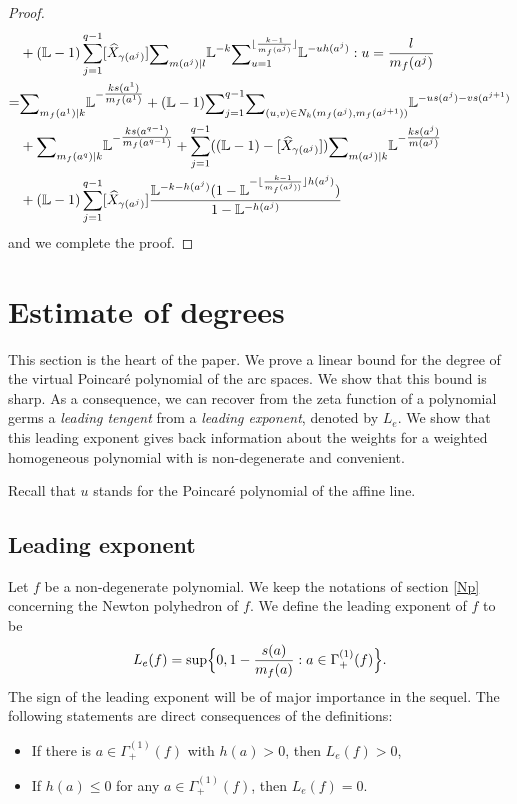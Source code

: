 \documentclass[12pt,a4paper,leqno]{amsart}
\theoremstyle{definition}
\begin{document}
\begin{proof}
{\begin{align*}
&+({\mathbb{L}}-1)\sum_{j=1}^{q-1}[\widehat{X}_{\gamma(a^j)}]
{\mathop{\textrm{\scriptsize $\mathop\sum$}}}_{m(a^j)|l}{\mathbb{L}}^{-k}
{\mathop{\textrm{\scriptsize $\mathop\sum$}}}_{u=1}^{\lfloor\frac{k-1}{m_f(a^j)}\rfloor}
{\mathbb{L}}^{-u h(a^j)}:u=\frac{l}{m_f(a^j)}\\
=&
{\mathop{\textrm{\scriptsize $\mathop\sum$}}}_{m_f(a^1)|k} {\mathbb{L}}^{-\tfrac{ks(a^1)}{m_f(a^1)}}
+({\mathbb{L}}-1){\mathop{\textrm{\scriptsize $\mathop\sum$}}}_{j=1}^{q-1}
{\mathop{\textrm{\scriptsize $\mathop\sum$}}}_{(u,v)\in N_k(m_f(a^j),m_f(a^{j+1}))}{\mathbb{L}}^{-us(a^j)-vs(a^{j+1})}\\
&+{\mathop{\textrm{\scriptsize $\mathop\sum$}}}_{m_f(a^q)|k} {\mathbb{L}}^{-\tfrac{ks(a^{q-1})}{m_f(a^{q-1})}}
+\sum_{j=1}^{q-1}(({\mathbb{L}}-1)-[\widehat{X}_{\gamma(a^j)}])
{\mathop{\textrm{\scriptsize $\mathop\sum$}}}_{m(a^j)|k}{\mathbb{L}}^{-\tfrac{ks(a^j)}{m(a^j)}}\\
&+({\mathbb{L}}-1)\sum_{j=1}^{q-1}[\widehat{X}_{\gamma(a^j)}]
\frac{{\mathbb{L}}^{-k-h(a^j)}(1-{\mathbb{L}}^{-\lfloor\frac{k-1}{m_f(a^j))}\rfloor h(a^j)})}
{1-{\mathbb{L}}^{-h(a^j)}}
\end{align*}
}and we complete the proof.
\end{proof}

\section{Estimate of degrees}\label{estim-deg}

This section is the heart of the paper. We prove a linear bound for
the degree of the virtual Poincar\'e polynomial of the arc spaces. We
show that this bound is sharp. As a consequence, we can recover from
the zeta function of a polynomial germs a \textit{leading tengent} from a
\textit{leading exponent}, denoted by $L_e$. We show that this leading
exponent gives back information about the weights for a weighted
homogeneous polynomial with is non-degenerate and convenient.

Recall that $u$ stands for the Poincar\'e polynomial of the affine line.

\subsection{Leading exponent}\label{Le}
Let $f$ be a non-degenerate polynomial. We keep the notations of
section \ref{Np} concerning the Newton polyhedron of $f$.
We define the leading exponent of $f$ to be
$$
L_e(f)
=\sup\Bigl\{
0,1-\frac{s(a)}{m_f(a)}:a\in\Gamma_+^{(1)}(f)\Bigr\}. 
$$
The sign of the leading exponent will be of major importance in the
sequel. The following statements are direct consequences of the definitions: 
\begin{itemize}
\item If there is $a\in\Gamma^{(1)}_+(f)$ with $h(a)>0$, then $L_e(f)>0$, 
\item If $h(a)\le0$ for any $a\in\Gamma^{(1)}_+(f)$, then $L_e(f)=0$. 
\end{itemize}
\end{document}

